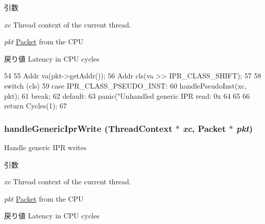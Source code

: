 \begin{DoxyParams}{引数}
\item[{\em xc}]Thread context of the current thread. \item[{\em pkt}]\hyperlink{classPacket}{Packet} from the CPU \end{DoxyParams}
\begin{DoxyReturn}{戻り値}
Latency in CPU cycles 
\end{DoxyReturn}



\begin{DoxyCode}
54 {
55     Addr va(pkt->getAddr());
56     Addr cls(va >> IPR_CLASS_SHIFT);
57 
58     switch (cls) {
59     case IPR_CLASS_PSEUDO_INST:
60         handlePseudoInst(xc, pkt);
61         break;
62     default:
63         panic("Unhandled generic IPR read: 0x%
64     }
65 
66     return Cycles(1);
67 }
\end{DoxyCode}
\hypertarget{namespaceGenericISA_a1412c2f2794674f9be65d92b5b0f0b18}{
\subsubsection[{handleGenericIprWrite}]{ handleGenericIprWrite ({\bf ThreadContext} $\ast$ {\em xc}, \/  {\bf Packet} $\ast$ {\em pkt})}}
\label{namespaceGenericISA_a1412c2f2794674f9be65d92b5b0f0b18}
Handle generic IPR writes


\begin{DoxyParams}{引数}
\item[{\em xc}]Thread context of the current thread. \item[{\em pkt}]\hyperlink{classPacket}{Packet} from the CPU \end{DoxyParams}
\begin{DoxyReturn}{戻り値}
Latency in CPU cycles 
\end{DoxyReturn}



